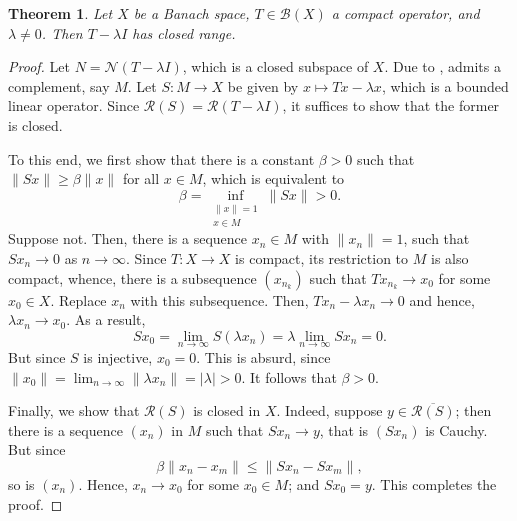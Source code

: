 \documentclass[11pt]{article}
\theoremstyle{thmstyle}
\newtheorem{theorem}{Theorem}[section]
\theoremstyle{defstyle}
\newcommand{\scrB}{\mathscr B}
\newcommand{\scrN}{\mathscr N}
\newcommand{\scrR}{\mathscr R}
\renewcommand{\le}{\leqslant}
\renewcommand{\ge}{\geqslant}
\begin{document}
\begin{theorem}
    Let $X$ be a Banach space, $T\in\scrB(X)$ a compact operator, and $\lambda\ne 0$. Then $T - \lambda I$ has closed range.
\end{theorem}
\begin{proof}
    Let $N = \scrN(T - \lambda I)$, which is a closed subspace of $X$. Due to , admits a complement, say $M$. Let $S: M\to X$ be given by $x\mapsto Tx - \lambda x$, which is a bounded linear operator. Since $\scrR(S) = \scrR(T - \lambda I)$, it suffices to show that the former is closed. 

    To this end, we first show that there is a constant $\beta > 0$ such that $\|Sx\|\ge\beta\|x\|$ for all $x\in M$, which is equivalent to 
    \begin{equation*}
        \beta = \inf_{\substack{\|x\| = 1\\ x\in M}}\|Sx\| > 0.
    \end{equation*}
    Suppose not. Then, there is a sequence $x_n\in M$ with $\|x_n\| = 1$, such that $Sx_n\to 0$ as $n\to\infty$. Since $T: X\to X$ is compact, its restriction to $M$ is also compact, whence, there is a subsequence $(x_{n_k})$ such that $Tx_{n_k}\to x_0$ for some $x_0\in X$. Replace $x_n$ with this subsequence. Then, $Tx_n - \lambda x_n\to 0$ and hence, $\lambda x_n\to x_0$. As a result, 
    \begin{equation*}
        Sx_0 = \lim_{n\to\infty} S(\lambda x_n) = \lambda\lim_{n\to\infty} Sx_n = 0.
    \end{equation*}
    But since $S$ is injective, $x_0 = 0$. This is absurd, since $\|x_0\| = \lim_{n\to\infty}\|\lambda x_n\| = |\lambda| > 0$. It follows that $\beta > 0$.

    Finally, we show that $\scrR(S)$ is closed in $X$. Indeed, suppose $y\in\overline{\scrR(S)}$; then there is a sequence $(x_n)$ in $M$ such that $Sx_n\to y$, that is $(Sx_n)$ is Cauchy. But since 
    \begin{equation*}
        \beta\|x_n - x_m\|\le\|Sx_n - Sx_m\|,
    \end{equation*}
    so is $(x_n)$. Hence, $x_n\to x_0$ for some $x_0\in M$; and $Sx_0 = y$. This completes the proof.
\end{proof}
\end{document}

